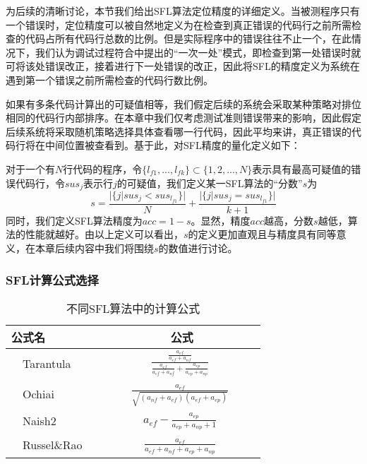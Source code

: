 为后续的清晰讨论，本节我们给出SFL算法定位精度的详细定义。当被测程序只有一个错误时，定位精度可以被自然地定义为在检查到真正错误的代码行之前所需检查的代码占所有代码行总数的比例。但是实际程序中的错误往往不止一个，在此情况下，我们认为调试过程符合\cite{Steimann:2013:TVV:2483760.2483767}中提出的“一次一处”模式，即检查到第一处错误时就可将该处错误改正，接着进行下一处错误的改正，因此将SFL的精度定义为系统在遇到第一个错误之前所需检查的代码行数比例。

如果有多条代码计算出的可疑值相等，我们假定后续的系统会采取某种策略对排位相同的代码行内部排序。在本章中我们仅考虑测试准则错误带来的影响，因此假定后续系统将采取随机策略选择具体查看哪一行代码，因此平均来讲，真正错误的代码行将在中间位置被查看到。基于此，对SFL精度的量化定义如下：

对于一个有$N$行代码的程序，令$\{l_{f1},..., l_{fk}\} \subset \{1, 2, ..., N\}$表示具有最高可疑值的错误代码行，令$sus_j$表示行$j$的可疑值，我们定义某一SFL算法的“分数”$s$为
\begin{equation}
\label{equ: score}
s = \frac{|\{j|sus_j < sus_{l_{f1}}\}|}{N} + \frac{|\{j|sus_j = sus_{l_{f1}}\}|}{k + 1}
\end{equation}
同时，我们定义SFL算法精度为$acc = 1 - s$。显然，精度$acc$越高，分数$s$越低，算法的性能就越好。由以上定义可以看出，$s$的定义更加直观且与精度具有同等意义，在本章后续内容中我们将围绕$s$的数值进行讨论。

\subsubsection{SFL计算公式选择}


\begin{table}[!b]
	\caption{不同SFL算法中的计算公式}\label{Tab: Formulas}
	\begin{center}
		\begin{tabular}{l|c}
			\hline 公式名 & 公式 \\ 
			\hline \ \ Tarantula\ \     & \ \ \ \ $\frac{\frac{a_{ef}}{a_{ef} + a_{nf}}}{\frac{a_{ef}}{a_{ef} + a_{nf}} + \frac{a_{ep}}{a_{ep} + a_{np}}}$ \ \ \ \  \\ 
			\hline \ \ Ochiai \ \       & \ \ \ \ $\frac{a_{ef}}{\sqrt{(a_{nf} + a_{ef}) (a_{ef} + a_{ep})}}$ \ \ \ \  \\
			\hline \ \ Naish2 \ \       & \ \ \ \ $a_{ef} - \frac{a_{ep}}{a_{ep} + a_{np} + 1}$ \ \ \ \  \\ 
			\hline \ \ Russel\&Rao \ \  & \ \ \ \ $\frac{a_{ef}}{a_{ef} + a_{nf} + a_{ep} + a_{np}}$ \ \ \ \ \\ 
			\hline 
		\end{tabular}
	\end{center}
\end{table}

